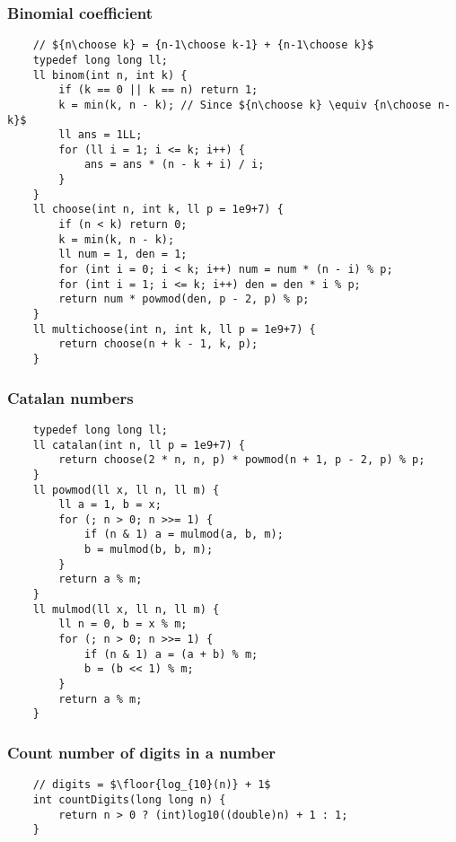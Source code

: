 \documentclass{article}
\begin{document}
\subsubsection{Binomial coefficient}
\begin{verbatim}
    // ${n\choose k} = {n-1\choose k-1} + {n-1\choose k}$
    typedef long long ll;
    ll binom(int n, int k) {
        if (k == 0 || k == n) return 1;
        k = min(k, n - k); // Since ${n\choose k} \equiv {n\choose n-k}$
        ll ans = 1LL;
        for (ll i = 1; i <= k; i++) {
            ans = ans * (n - k + i) / i;
        }
    }
    ll choose(int n, int k, ll p = 1e9+7) {
        if (n < k) return 0;
        k = min(k, n - k);
        ll num = 1, den = 1;
        for (int i = 0; i < k; i++) num = num * (n - i) % p;
        for (int i = 1; i <= k; i++) den = den * i % p;
        return num * powmod(den, p - 2, p) % p;
    }
    ll multichoose(int n, int k, ll p = 1e9+7) {
        return choose(n + k - 1, k, p);
    }
\end{verbatim}

\subsubsection{Catalan numbers}
\begin{verbatim}
    typedef long long ll;
    ll catalan(int n, ll p = 1e9+7) {
        return choose(2 * n, n, p) * powmod(n + 1, p - 2, p) % p;
    }
    ll powmod(ll x, ll n, ll m) {
        ll a = 1, b = x;
        for (; n > 0; n >>= 1) {
            if (n & 1) a = mulmod(a, b, m);
            b = mulmod(b, b, m);
        }
        return a % m;
    }
    ll mulmod(ll x, ll n, ll m) {
        ll n = 0, b = x % m;
        for (; n > 0; n >>= 1) {
            if (n & 1) a = (a + b) % m;
            b = (b << 1) % m;
        }
        return a % m;
    }
\end{verbatim}

\subsubsection{Count number of digits in a number}
\begin{verbatim}
    // digits = $\floor{log_{10}(n)} + 1$
    int countDigits(long long n) {
        return n > 0 ? (int)log10((double)n) + 1 : 1;
    }
\end{verbatim}
\end{document}
